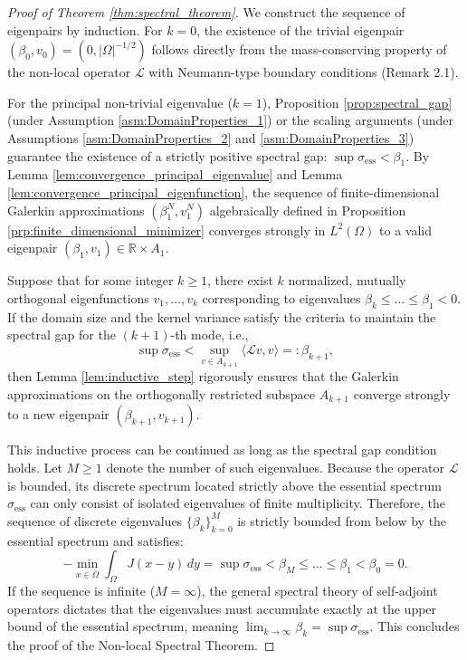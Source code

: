 \documentclass[12pt, a4paper]{article}
\theoremstyle{break}
\theoremstyle{break}
\theoremstyle{break}
\theoremstyle{break}
\theoremstyle{break}
\theoremstyle{break}
\theoremstyle{break}
\theoremstyle{break}
\theoremstyle{break}
\begin{document}
\begin{proof}[Proof of Theorem \ref{thm:spectral_theorem}]
    We construct the sequence of eigenpairs by induction. For $k=0$, the existence of the trivial eigenpair $(\beta_0, v_0) = (0, |\Omega|^{-1/2})$ follows directly from the mass-conserving property of the non-local operator $\mathcal{L}$ with Neumann-type boundary conditions (Remark 2.1).

    For the principal non-trivial eigenvalue ($k=1$), Proposition \ref{prop:spectral_gap} (under Assumption \ref{asm:DomainProperties_1}) or the scaling arguments (under Assumptions \ref{asm:DomainProperties_2} and \ref{asm:DomainProperties_3}) guarantee the existence of a strictly positive spectral gap: $\sup \sigma_{\mathrm{ess}} < \beta_1$. By Lemma \ref{lem:convergence_principal_eigenvalue} and Lemma \ref{lem:convergence_principal_eigenfunction}, the sequence of finite-dimensional Galerkin approximations $(\beta_1^N, v_1^N)$ algebraically defined in Proposition \ref{prp:finite_dimensional_minimizer} converges strongly in $L^2(\Omega)$ to a valid eigenpair $(\beta_1, v_1) \in \mathbb{R} \times A_1$.

    Suppose that for some integer $k \geq 1$, there exist $k$ normalized, mutually orthogonal eigenfunctions $v_1, \dots, v_k$ corresponding to eigenvalues $\beta_k \leq \dots \leq \beta_1 < 0$. If the domain size and the kernel variance satisfy the criteria to maintain the spectral gap for the $(k+1)$-th mode, i.e.,
    \begin{equation*}
        \sup \sigma_{\mathrm{ess}} < \sup_{v \in A_{k+1}} \langle \mathcal{L}v, v \rangle =: \beta_{k+1},
    \end{equation*}
    then Lemma \ref{lem:inductive_step} rigorously ensures that the Galerkin approximations on the orthogonally restricted subspace $A_{k+1}$ converge strongly to a new eigenpair $(\beta_{k+1}, v_{k+1})$. 
    
    This inductive process can be continued as long as the spectral gap condition holds. Let $M \geq 1$ denote the number of such eigenvalues. Because the operator $\mathcal{L}$ is bounded, its discrete spectrum located strictly above the essential spectrum $\sigma_{\mathrm{ess}}$ can only consist of isolated eigenvalues of finite multiplicity. Therefore, the sequence of discrete eigenvalues $\{\beta_k\}_{k=0}^M$ is strictly bounded from below by the essential spectrum and satisfies:
    \begin{equation*}
        -\min_{x \in \overline{\Omega}} \int_\Omega J(x-y) \, dy = \sup \sigma_{\mathrm{ess}} < \beta_M \leq \dots \leq \beta_1 < \beta_0 = 0.
    \end{equation*}
    If the sequence is infinite ($M = \infty$), the general spectral theory of self-adjoint operators dictates that the eigenvalues must accumulate exactly at the upper bound of the essential spectrum, meaning $\lim_{k \to \infty} \beta_k = \sup \sigma_{\mathrm{ess}}$. This concludes the proof of the Non-local Spectral Theorem.
\end{proof}
\end{document}
